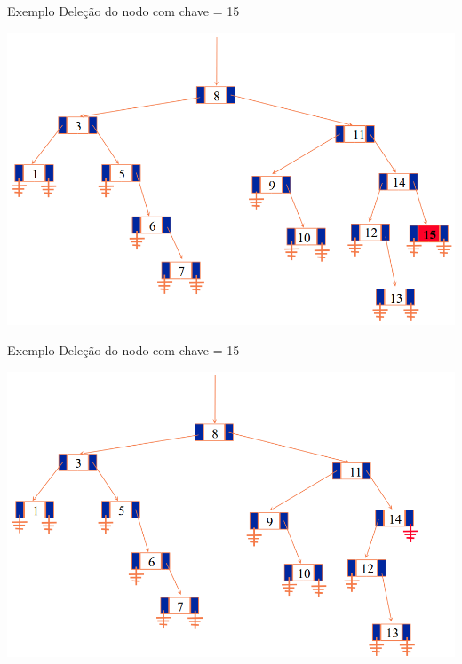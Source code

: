 \documentclass[12pt,table,xcolor={dvipsnames}]{beamer}
\begin{document}
\begin{frame}[fragile]{Exemplo}
Deleção do nodo com chave = 15
\begin{center}
\includegraphics[scale=.3]{arv8.png} 
\end{center}
\end{frame}

\begin{frame}[fragile]{Exemplo}
Deleção do nodo com chave = 15
\begin{center}
\includegraphics[scale=.3]{arv9.png} 
\end{center}
\end{frame}
\end{document}
